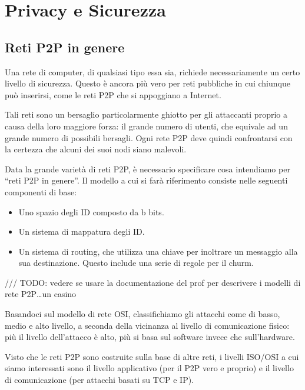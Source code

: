\chapter{Privacy e Sicurezza}\label{privacy-e-sicurezza}

\section{Reti P2P in genere}\label{reti-p2p-in-genere}

Una rete di computer, di qualsiasi tipo essa sia, richiede
necessariamente un certo livello di sicurezza. Questo è ancora più vero
per reti pubbliche in cui chiunque può inserirsi, come le reti P2P che
si appoggiano a Internet.

Tali reti sono un bersaglio particolarmente ghiotto per gli attaccanti
proprio a causa della loro maggiore forza: il grande numero di utenti,
che equivale ad un grande numero di possibili bersagli. Ogni rete P2P
deve quindi confrontarsi con la certezza che alcuni dei suoi nodi siano
malevoli.

Data la grande varietà di reti P2P, è necessario specificare cosa
intendiamo per ``reti P2P in genere''. Il modello \cite{vulenrabilities}
a cui si farà riferimento consiste nelle seguenti componenti di base:

\begin{itemize}
\itemsep1pt\parskip0pt
\item
  Uno spazio degli ID composto da b bits.
\item
  Un sistema di mappatura degli ID.
\item
  Un sistema di routing, che utilizza una chiave per inoltrare un
  messaggio alla sua destinazione. Questo include una serie di regole
  per il churm.
\end{itemize}

/// TODO: vedere se usare la documentazione del prof per descrivere i
modelli di rete P2P\ldots{}un casino

Basandoci sul modello di rete OSI, classifichiamo gli attacchi come di
basso, medio e alto livello, a seconda della vicinanza al livello di
comunicazione fisico: più il livello dell'attacco è alto, più si basa
sul software invece che sull'hardware.

Visto che le reti P2P sono costruite sulla base di altre reti, i livelli
ISO/OSI a cui siamo interessati sono il livello applicativo (per il P2P
vero e proprio) e il livello di comunicazione (per attacchi basati su
TCP e IP).


